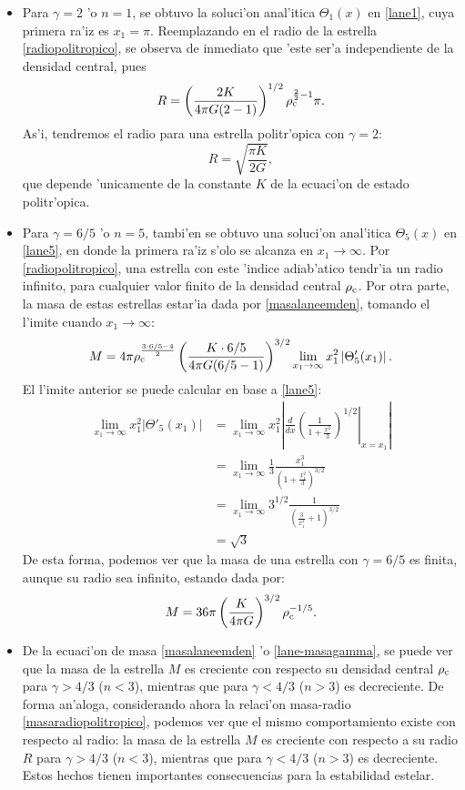 \begin{itemize}
\item Para $\gamma=2$ 'o $n=1$, se obtuvo la soluci'on anal'itica $\Theta_1(x)$ en \eqref{lane1}, cuya primera ra'iz es $x_1=\pi$. Reemplazando en el radio de la estrella \eqref{radiopolitropico}, se observa de inmediato que 'este ser'a independiente de la densidad central, pues
 \begin{equation}
  R=\left(\frac{2K}{4\pi G(2-1)}\right)^{1/2}\rho_{\rm c}^{\frac{2}{2}-1}\pi.
 \end{equation}
As'i, tendremos el radio para una estrella politr'opica con $\gamma=2$:
\begin{equation}
 R=\sqrt{\frac{\pi K}{2G}},
\end{equation}
que depende 'unicamente de la constante $K$ de la ecuaci'on de estado politr'opica.

\item  Para $\gamma=6/5$ 'o $n=5$, tambi'en se obtuvo una soluci'on anal'itica $\Theta_5(x)$ en \eqref{lane5}, en donde la primera ra'iz s'olo se alcanza en $x_1\to\infty$. Por \eqref{radiopolitropico}, una estrella con este 'indice adiab'atico tendr'ia un radio infinito, para cualquier valor finito de la densidad central $\rho_{\rm c}$. Por otra parte, la masa de estas estrellas estar'ia dada por \eqref{masalaneemden}, tomando el l'imite cuando $x_1\to\infty$:
\begin{align}
 M=4\pi\rho_{\rm c}^{\frac{3\cdot6/5-4}{2}}\left(\frac{K\cdot6/5}{4\pi G(6/5-1)}\right)^{3/2}\lim_{x_1\to\infty}x_1^2\left|\Theta'_5(x_1)\right|.
\end{align}
El l'imite anterior se puede calcular en base a \eqref{lane5}:
\begin{align}
 \lim_{x_1\to\infty}x_1^2\left|\Theta'_5(x_1)\right|&=\lim_{x_1\to\infty}x_1^2\left|\frac{d}{dx}\left.\left(\frac{1}{1+\frac{x^2}{3}}\right)^{1/2}\right|_{x=x_1}\right|\\
 &=\lim_{x_1\to\infty}\frac{1}{3}\frac{x_1^3}{\left(1+\frac{x_1^2}{3}\right)^{3/2}}\\
 &=\lim_{x_1\to\infty}3^{1/2}\frac{1}{\left(\frac{3}{x_1^2}+1\right)^{3/2}}\\
 &=\sqrt{3}
\end{align}
De esta forma, podemos ver que la masa de una estrella con $\gamma=6/5$ es finita, aunque su radio sea infinito, estando dada por:
\begin{equation}
 M=36\pi\left(\frac{K}{4\pi G}\right)^{3/2}\rho_{\rm c}^{-1/5}.
\end{equation}


 \item De la ecuaci'on de masa \eqref{masalaneemden} 'o \eqref{lane-masagamma}, se puede ver que la masa de la estrella $M$ es creciente con respecto su densidad central $\rho_{\rm c}$ para $\gamma>4/3$ ($n<3$), mientras que para $\gamma<4/3$ ($n>3$) es decreciente. De forma an'aloga, considerando ahora la relaci'on masa-radio \eqref{masaradiopolitropico}, podemos ver que el mismo comportamiento existe con respecto al radio: la masa de la estrella $M$ es creciente con respecto a su radio $R$ para $\gamma>4/3$ ($n<3$), mientras que para $\gamma<4/3$ ($n>3$) es decreciente. Estos hechos tienen importantes consecuencias para la estabilidad estelar.


\end{itemize}
